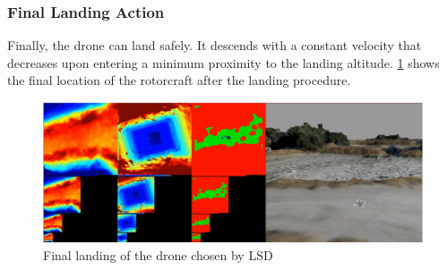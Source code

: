 \subsubsection{Final Landing Action}

Finally, the drone can land safely. It descends with a constant velocity that decreases upon entering a minimum proximity to the landing altitude.
\cref{fig:demo_final_landing} shows the final location of the rotorcraft after the landing procedure.

\begin{figure}[h]
\centering
\includegraphics[scale=0.25]{images/autonomous_landing/demo_flight/landed.png}
\caption{Final landing of the drone chosen by LSD}
\label{fig:demo_final_landing}
\end{figure}